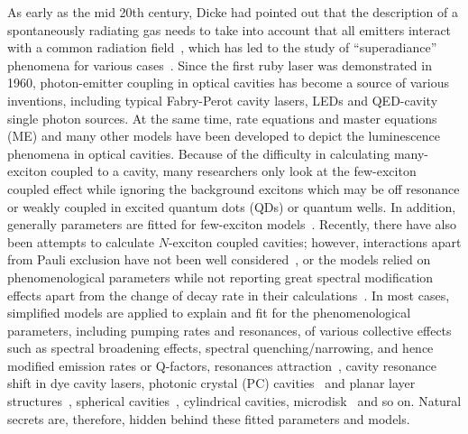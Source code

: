 As early as the mid 20th century, Dicke had pointed out that the description of a spontaneously radiating gas needs to take into account that all emitters interact with a common radiation field~\cite{Dicke1954}, which has led to the study of ``superadiance'' phenomena for various cases~\cite{Friedberg1973,Friedberg2010,Svidzinsky2010,Scully2010,Rohlsberger2010}. Since the first ruby laser was demonstrated in 1960\cite{Maiman1960}, photon-emitter coupling in optical cavities has become a source of various inventions, including typical Fabry-Perot cavity lasers, LEDs and QED-cavity single photon sources\cite{Pelton2002,Santori2002,Schwagmann2011,Reimer2012}. At the same time, rate equations and master equations (ME) and many other models have been developed to depict the luminescence phenomena in optical cavities. Because of the difficulty in calculating many-exciton coupled to a cavity,
many researchers only look at the few-exciton coupled effect while ignoring the background excitons which may be off resonance or weakly coupled in  excited quantum dots (QDs) or quantum wells. In addition, generally parameters are fitted for few-exciton models~\cite{Laussy2008,Yao2009b,Yao2009c,Yao2009a,VanVlack2011,Reitzenstein2010,Hughes2009,Kristensen2011}.
Recently, there have also been attempts to calculate $N$-exciton coupled cavities;
however, interactions apart from Pauli exclusion have not been well considered~\cite{Illes2010a,Laussy2011,Laussy2006,Meldrum2010},
or the models relied on phenomenological parameters while not reporting great spectral modification effects apart from the change of decay rate in their calculations~\cite{Nowak2008,Meldrum2009,Temnov2005}.
In most cases, simplified models are applied to explain and fit for the phenomenological parameters,
including pumping rates and resonances, of various collective effects
such as spectral broadening effects\cite{Ulhaq2010},
spectral quenching/narrowing\cite{Zeller1998}, and hence modified emission rates or Q-factors,
resonances attraction~\cite{Tawara2010}, cavity resonance shift in dye cavity lasers,
photonic crystal (PC) cavities~\cite{Tawara2008,Luk2011} and planar layer structures~\cite{Walters2006},
spherical cavities~\cite{Meldrum2010,Bianucci2011},
cylindrical cavities, microdisk~\cite{Kekatpure2008} and so on.
Natural secrets are, therefore, hidden behind these fitted parameters and models.

